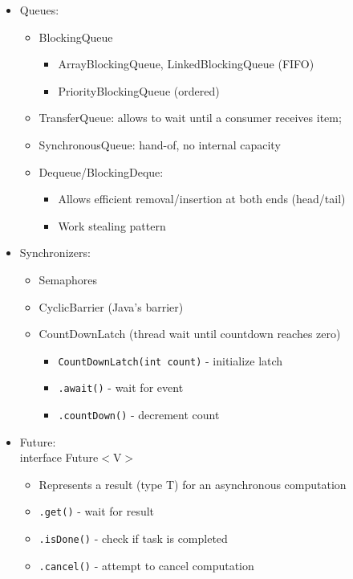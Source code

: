 \documentclass[a4paper]{article}
\newcommand{\inline}[1]{\lstinline!#1!}%
\begin{document}
\begin{itemize}
\begin{itemize}
\begin{itemize}
\end{itemize}
\end{itemize}
\item Queues: 
\begin{itemize}
\item BlockingQueue
\begin{itemize}
\item ArrayBlockingQueue, LinkedBlockingQueue (FIFO)
\item PriorityBlockingQueue (ordered)
\end{itemize}
\item TransferQueue: allows to wait until a consumer receives item; 
\item SynchronousQueue: hand-of, no internal capacity 
\item Dequeue/BlockingDeque: 
\begin{itemize}
\item Allows efficient removal/insertion at both ends (head/tail)
\item Work stealing pattern
\end{itemize}
\end{itemize}
\item Synchronizers: 
\begin{itemize}
\item Semaphores
\item CyclicBarrier (Java's barrier)
\item CountDownLatch (thread wait until countdown reaches zero)
\begin{itemize}
\item \inline{CountDownLatch(int count)} - initialize latch
\item \inline{.await()} - wait for event
\item \inline{.countDown()} - decrement count
\end{itemize}
\end{itemize}
\item Future: \\
interface Future$<$V$>$
\begin{itemize}
\item Represents a result (type T) for an asynchronous computation
\item \inline{.get()} - wait for result
\item \inline{.isDone()} - check if task is completed
\item \inline{.cancel()} - attempt to cancel computation
\end{itemize}
\end{itemize}
\end{document}
